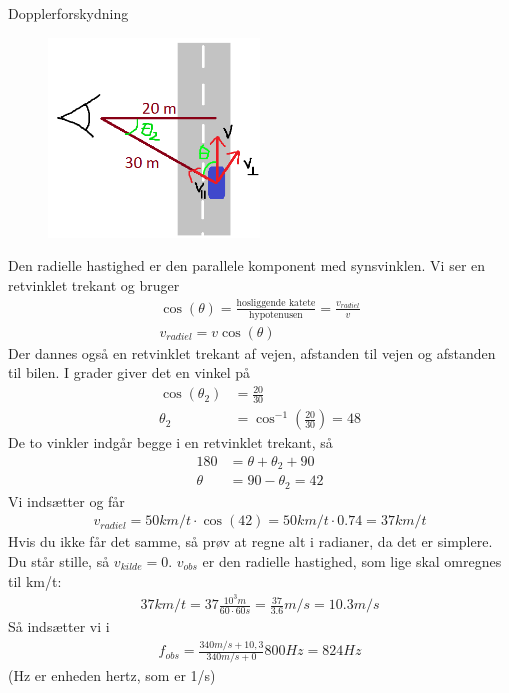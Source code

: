 \begin{opgave}{Dopplerforskydning}
	\opg 
	\begin{figure}[h!]
		\centering
		\includegraphics[width=0.5\textwidth]{opg/figurer/PolitiLoesning.png}
	\end{figure}
	\opg Den radielle hastighed er den parallele komponent med synsvinklen. Vi ser en retvinklet trekant og bruger
	\begin{align}
		\cos(\theta)=\frac{\text{hosliggende katete}}{\text{hypotenusen}}=\frac{v_{radiel}}{v} \\
		v_{radiel}=v \cos(\theta)
	\end{align}
	Der dannes også en retvinklet trekant af vejen, afstanden til vejen og afstanden til bilen. I grader giver det en vinkel på
	\begin{align}
		\cos(\theta_2)&=\frac{20}{30}\\
		\theta_2 &= \cos^{-1} \left( \frac{20}{30} \right) = 48
	\end{align}
	De to vinkler indgår begge i en retvinklet trekant, så
	\begin{align}
		180 &= \theta + \theta_2 + 90\\
		\theta &= 90 - \theta_2  = 42
	\end{align}
	Vi indsætter og får
	\begin{align}
	v_{radiel}=50 km/t \cdot \cos(42) = 50 km/t \cdot 0.74 = 37 km/t
	\end{align}
	Hvis du ikke får det samme, så prøv at regne alt i radianer, da det er simplere.
	\opg 
	Du står stille, så $v_{kilde}=0$. $v_{obs}$ er den radielle hastighed, som lige skal omregnes til km/t:
	\begin{align}
	37 km/t = 37 \frac{10^{3}m}{60\cdot60 s} = \frac{37}{3.6} m/s = 10.3 m/s
	\end{align}
	Så indsætter vi i
	\begin{align}
	f_{obs} = \frac{340 m/s + 10,3}{340 m/s + 0} 800 Hz = 824 Hz
	\end{align}
    (Hz er enheden hertz, som er 1/s)
\end{opgave}

